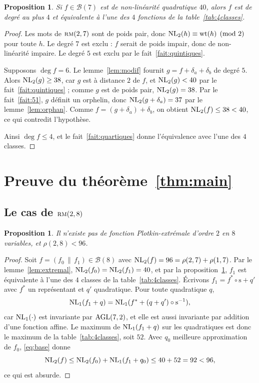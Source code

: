 \documentclass[11pt,a4paper]{article}
\newcommand{\wt}{\mathrm{wt}}
\def\NL(#1,#2){ {\rm NL}_{#1}(#2) }
\def\AGL(#1,#2){ {\rm AGL}(#1,#2) }
\def\agl#1{ {\mathrm #1 }}
\def\rmc(#1,#2){ \textsc {rm}(#1,#2) }
\def\boole(#1){\mathcal{B}(#1)}
\theoremstyle{plain}
\newtheorem{proposition}[theorem]{Proposition}
\theoremstyle{definition}
\theoremstyle{remark}
\begin{document}
\begin{proposition}\label{prop:complet}
Si $f\in\boole(7)$ est de non-linéarité quadratique $40$, alors $f$ est de
degré au plus $4$ et équivalente à l'une des $4$ fonctions de la
table~\ref{tab:4classes}.
\end{proposition}
\begin{proof}
Les mots de $\rmc(2,7)$ sont de poids pair, donc $\NL(2,h)\equiv\wt(h)
\pmod 2$ pour toute $h$. Le degré $7$ est exclu : $f$ serait de poids impair,
donc de non-linéarité impaire. Le degré $5$ est exclu par le
fait~\ref{fait:quintiques}.

Supposons $\deg f=6$. Le lemme~\ref{lem:modif} fournit $g=f+\delta_a+\delta_b$
de degré $5$. Alors $\NL(2,g)\ge 38$, car $g$ est à distance $2$ de $f$, et
$\NL(2,g)<40$ par le fait~\ref{fait:quintiques} ; comme $g$ est de poids pair,
$\NL(2,g)=38$. Par le fait~\ref{fait:51}, $g$ définit un orphelin, donc
$\NL(2,g+\delta_a)=37$ par le lemme~\ref{lem:orphan}. Comme $f=(g+\delta_a)+
\delta_b$, on obtient $\NL(2,f)\le 38<40$, ce qui contredit l'hypothèse.

Ainsi $\deg f\le4$, et le fait~\ref{fait:quartiques} donne l'équivalence avec
l'une des $4$ classes.
\end{proof}

\section{Preuve du théorème~\ref{thm:main}}\label{sec:preuves}

\subsection{Le cas de $\rmc(2,8)$}

\begin{proposition}\label{prop:28}
Il n'existe pas de fonction Plotkin-extrémale d'ordre $2$ en $8$ variables, et
$\rho(2,8)<96$.
\end{proposition}
\begin{proof}
Soit $f=(f_0\,\|\,f_1)\in\boole(8)$ avec $\NL(2,f)=96=\rho(2,7)+\rho(1,7)$. Par
le lemme~\ref{lem:extremal}, $\NL(2,f_0)=\NL(2,f_1)=40$, et par la
proposition~\ref{prop:complet}, $f_1$ est équivalente à l'une des $4$ classes
de la table~\ref{tab:4classes}. Écrivons $f_1=f^{\ast}\circ\agl s+q'$ avec
$f^{\ast}$ un représentant et $q'$ quadratique. Pour toute quadratique $q$,
$$
\NL(1,f_1+q)=\NL(1,f^{\ast}+(q+q')\circ\agl s^{-1}),
$$
car $\NL(1,\cdot)$ est invariante par $\AGL(7,2)$, et elle est aussi invariante
par addition d'une fonction affine. Le maximum de $\NL(1,f_1+q)$ sur les
quadratiques est donc le maximum de la table~\ref{tab:4classes}, soit $52$.
Avec $q_0$ meilleure approximation de $f_0$, \eqref{eq:base} donne
$$
\NL(2,f)\le \NL(2,f_0)+\NL(1,f_1+q_0)\le 40+52=92<96,
$$
ce qui est absurde.
\end{proof}
\end{document}
